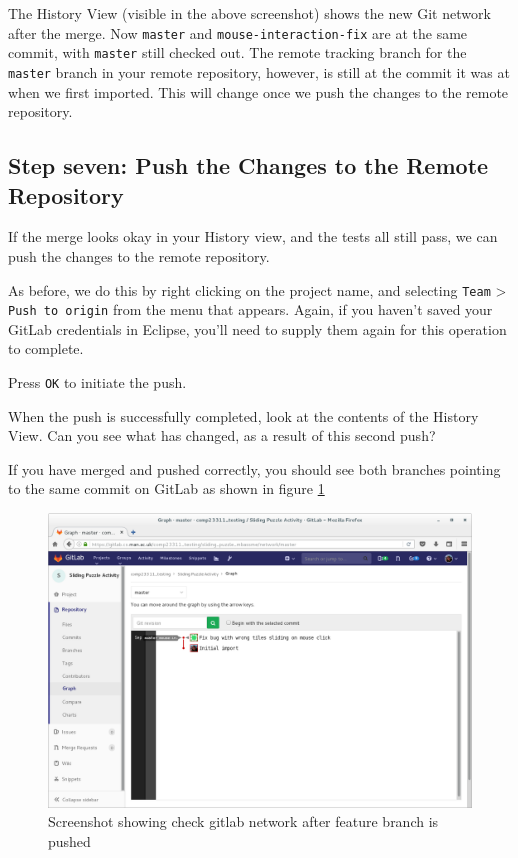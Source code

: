 \documentclass[
]{book}
\begin{document}
The History View (visible in the above screenshot) shows the new Git network after the merge. Now \texttt{master} and \texttt{mouse-interaction-fix} are at the same commit, with \texttt{master} still checked out. The remote tracking branch for the \texttt{master} branch in your remote repository, however, is still at the commit it was at when we first imported. This will change once we push the changes to the remote repository.

\hypertarget{pushingchange}{%
\subsection{Step seven: Push the Changes to the Remote Repository}\label{pushingchange}}

If the merge looks okay in your History view, and the tests all still pass, we can push the changes to the remote repository.

As before, we do this by right clicking on the project name, and selecting \texttt{Team} \textgreater{} \texttt{Push\ to\ origin} from the menu that appears. Again, if you haven't saved your GitLab credentials in Eclipse, you'll need to supply them again for this operation to complete.

Press \texttt{OK} to initiate the push.

When the push is successfully completed, look at the contents of the History View. Can you see what has changed, as a result of this second push?

If you have merged and pushed correctly, you should see both branches pointing to the same commit on GitLab as shown in figure \ref{fig:checkGitLabNetworkAfterFeatureBranchIsPushed-fig}

\begin{figure}

{\centering \includegraphics[width=1\linewidth]{images/checkGitLabNetworkAfterFeatureBranchIsPushed} 

}

\caption{Screenshot showing check gitlab network after feature branch is pushed}\label{fig:checkGitLabNetworkAfterFeatureBranchIsPushed-fig}
\end{figure}
\end{document}
